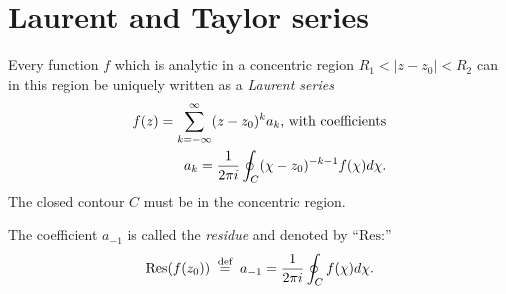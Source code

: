  \section{Laurent and Taylor series}


Every function $f$ which is analytic in a concentric region
$R_1< \vert z-z_0\vert <R_2$ can in this region be uniquely
 written as a {\em Laurent series}
\begin{equation}
\begin{split}
f(z)=\sum_{k=-\infty}^\infty (z-z_0)^k a_k \text{, with coefficients}
\\
a_k={1\over 2\pi i}\oint_C (\chi -z_0)^{-k-1}f(\chi ) d\chi .
\label{011-m-ch-ca-else1}
\end{split}
\end{equation}
The closed contour $C$ must be in the concentric region.

The coefficient $a_{-1}$ is called the {\em residue} and denoted by ``$\text{Res}$:''
\begin{equation}
\text{Res}(f(z_0)) \stackrel{{\tiny \textrm{ def }}}{=} a_{-1}={1\over 2\pi i}\oint_C f(\chi )d\chi
.
\label{011-m-ch-ca-else2}
\end{equation}



